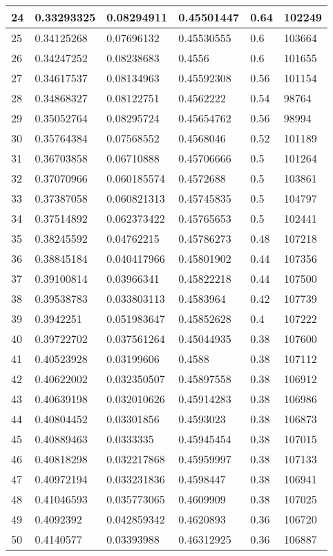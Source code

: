 \begin{longtable}{|l|l|l|l|l|l|}
24 & 0.33293325 & 0.08294911 & 0.45501447 & 0.64 & 102249 \\ \hline 
25 & 0.34125268 & 0.07696132 & 0.45530555 & 0.6 & 103664 \\ \hline 
26 & 0.34247252 & 0.08238683 & 0.4556 & 0.6 & 101655 \\ \hline 
27 & 0.34617537 & 0.08134963 & 0.45592308 & 0.56 & 101154 \\ \hline 
28 & 0.34868327 & 0.08122751 & 0.4562222 & 0.54 & 98764 \\ \hline 
29 & 0.35052764 & 0.08295724 & 0.45654762 & 0.56 & 98994 \\ \hline 
30 & 0.35764384 & 0.07568552 & 0.4568046 & 0.52 & 101189 \\ \hline 
31 & 0.36703858 & 0.06710888 & 0.45706666 & 0.5 & 101264 \\ \hline 
32 & 0.37070966 & 0.060185574 & 0.4572688 & 0.5 & 103861 \\ \hline 
33 & 0.37387058 & 0.060821313 & 0.45745835 & 0.5 & 104797 \\ \hline 
34 & 0.37514892 & 0.062373422 & 0.45765653 & 0.5 & 102441 \\ \hline 
35 & 0.38245592 & 0.04762215 & 0.45786273 & 0.48 & 107218 \\ \hline 
36 & 0.38845184 & 0.040417966 & 0.45801902 & 0.44 & 107356 \\ \hline 
37 & 0.39100814 & 0.03966341 & 0.45822218 & 0.44 & 107500 \\ \hline 
38 & 0.39538783 & 0.033803113 & 0.4583964 & 0.42 & 107739 \\ \hline 
39 & 0.3942251 & 0.051983647 & 0.45852628 & 0.4 & 107222 \\ \hline 
40 & 0.39722702 & 0.037561264 & 0.45044935 & 0.38 & 107600 \\ \hline 
41 & 0.40523928 & 0.03199606 & 0.4588 & 0.38 & 107112 \\ \hline 
42 & 0.40622002 & 0.032350507 & 0.45897558 & 0.38 & 106912 \\ \hline 
43 & 0.40639198 & 0.032010626 & 0.45914283 & 0.38 & 106986 \\ \hline 
44 & 0.40804452 & 0.03301856 & 0.4593023 & 0.38 & 106873 \\ \hline 
45 & 0.40889463 & 0.0333335 & 0.45945454 & 0.38 & 107015 \\ \hline 
46 & 0.40818298 & 0.032217868 & 0.45959997 & 0.38 & 107133 \\ \hline 
47 & 0.40972194 & 0.033231836 & 0.4598447 & 0.38 & 106941 \\ \hline 
48 & 0.41046593 & 0.035773065 & 0.4609909 & 0.38 & 107025 \\ \hline 
49 & 0.4092392 & 0.042859342 & 0.4620893 & 0.36 & 106720 \\ \hline 
50 & 0.4140577 & 0.03393988 & 0.46312925 & 0.36 & 106887 \\ \hline 
\end{longtable}